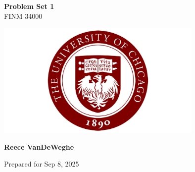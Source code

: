 \begin{titlepage}
    \begin{center}
    {\fontsize{40}{48}\selectfont \bfseries Problem Set 1} 
    \\\vspace{20pt}
    {\LARGE FINM 34000} \\
    \vspace{20pt}
    
    \vfill %

        \includegraphics[width=0.75\textwidth]{Images/uchicago_logo.png}

        \vfill %
        \textbf{Reece VanDeWeghe}

        Prepared for Sep 8, 2025
    \end{center}
\end{titlepage}
